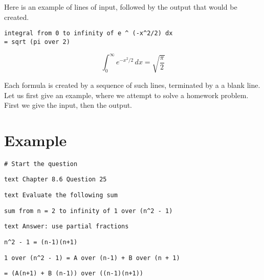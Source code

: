 \documentclass[12pt]{article}
\begin{document}
\noindent \indent
Here is an example of lines of input, followed by the output that would
be created.

\begin{verbatim}
integral from 0 to infinity of e ^ (-x^2/2) dx 
= sqrt (pi over 2)
\end{verbatim}

\[
\int _ {0} ^ {\infty} {e} ^ { - {x} ^ {2} / 2} \,d x = \sqrt{\frac {\pi} {2}}
\]

\noindent Each formula is created by a sequence of such lines, terminated by a 
a blank line.  Let us first give an example, where we attempt to solve
a homework problem.  First we give the input, then the output.

\newpage

\noindent \section{Example} \label{example}

\noindent \begin{verbatim}# Start the question
\end{verbatim}

\noindent \begin{verbatim}
text Chapter 8.6 Question 25
\end{verbatim}

\noindent \begin{verbatim}
text Evaluate the following sum
\end{verbatim}

\noindent \begin{verbatim}
sum from n = 2 to infinity of 1 over (n^2 - 1)
\end{verbatim}

\noindent \begin{verbatim}
text Answer: use partial fractions
\end{verbatim}

\noindent \begin{verbatim}
n^2 - 1 = (n-1)(n+1)
\end{verbatim}

\noindent \begin{verbatim}
1 over (n^2 - 1) = A over (n-1) + B over (n + 1)
\end{verbatim}

\noindent \begin{verbatim}
= (A(n+1) + B (n-1)) over ((n-1)(n+1))
\end{verbatim}
\end{document}
